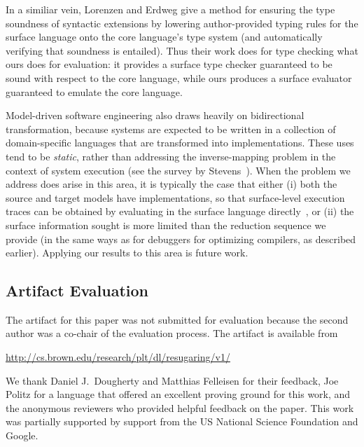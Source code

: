 In a similiar vein, Lorenzen and Erdweg \cite{typechecking-exts} give a
method for ensuring the type soundness of syntactic extensions by lowering
author-provided typing rules for the surface language onto the core
language's type system (and automatically verifying that soundness is
entailed). Thus their work does for type checking what ours does for
evaluation: it provides a surface type checker guaranteed to be sound with
respect to the core language, while ours produces a surface evaluator
guaranteed to emulate the core language.

Model-driven software engineering also draws heavily on
bidirectional transformation, because systems are expected to be written
in a collection of domain-specific languages that are transformed into
implementations. These uses tend to be \emph{static}, rather
than addressing the inverse-mapping problem in the context of system
execution (see the survey by
Stevens~\cite{bidirectional-model-transfs}).
When the problem we address does arise in this area, it is typically the
case that either (i) both the source and target models have
implementations, so that surface-level execution traces can be obtained
by evaluating in the surface language directly~\cite{Perera-slicing}, or
(ii) the surface information sought is more limited than the reduction
sequence we provide (in the same ways as for debuggers for optimizing
compilers, as described earlier).
Applying our results to this area is future work.

\subsection*{Artifact Evaluation}

The artifact for this paper was not submitted for evaluation because
the second author was a co-chair of the evaluation process. The
artifact is available from
\begin{center}
\url{http://cs.brown.edu/research/plt/dl/resugaring/v1/}
\end{center}

\acks We thank Daniel J.~Dougherty and Matthias Felleisen for their feedback,
Joe Politz for a language that offered an excellent proving ground for
this work, and the anonymous reviewers who provided helpful feedback on
the paper. This work was partially supported by support from the US
National Science Foundation and Google.





